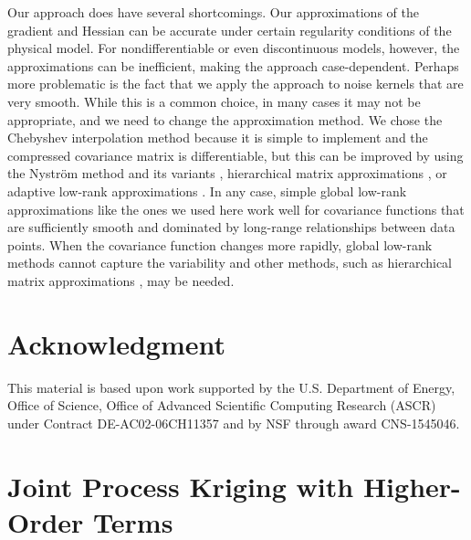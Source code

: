 \documentclass[article,ij4uq]{ij4uq}              %
\begin{document}
\par Our approach does have several shortcomings.  Our approximations of the gradient and Hessian can be accurate under certain regularity conditions of the physical model. For nondifferentiable or even discontinuous models, however, the approximations can be inefficient, making the approach case-dependent. Perhaps more problematic is the fact that we apply the approach to noise kernels that are very smooth. While this is a common choice, in many cases it may not be appropriate, and we need to change the approximation method. We chose the Chebyshev interpolation method because it is simple to implement and the compressed covariance matrix is differentiable, but this can be improved by using the Nystr\"{o}m method and its variants \cite{Nystrom1,Nystrom2}, hierarchical matrix approximations \cite{Hier1,BormApproximating}, or adaptive low-rank approximations \cite{AdaptiveLowRank1,AdaptiveLowRank2}. In any case, simple global low-rank approximations like the ones we used here work well for covariance functions that are sufficiently smooth and dominated by long-range relationships between data points. When the covariance function changes more rapidly, global low-rank methods cannot capture the variability and other methods, such as hierarchical matrix approximations \cite{Hier1,BormApproximating}, may be needed. 

\section*{Acknowledgment}
This material is based upon work
supported by the U.S. Department of Energy, Office of Science,
Office of Advanced Scientific Computing Research (ASCR) under
Contract DE-AC02-06CH11357 and by NSF
through award CNS-1545046. 

\newpage
\appendix
\section{Joint Process Kriging with Higher-Order Terms}\label{App:jpf}
\end{document}
